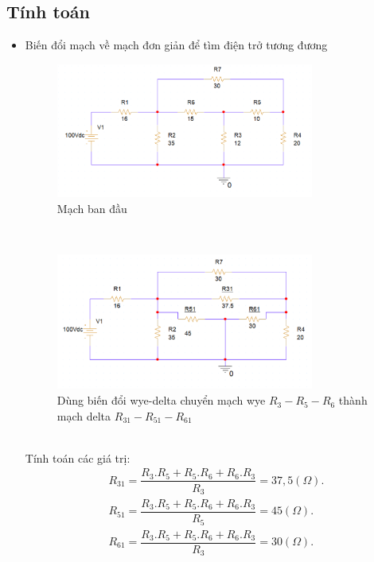 \subsection{Tính toán}
\begin{itemize}
    \item Biến đổi mạch về mạch đơn giản để tìm điện trở tương đương\\
    \begin{figure}[!htbp]
        \centering
        \includegraphics[width=0.8\textwidth]{graphics/ex10/f2.png}
        \caption{Mạch ban đầu}
        \end{figure}\\
        \begin{figure}[!htbp]
            \centering
            \includegraphics[width=0.8\textwidth]{graphics/ex10/f3.png}
            \caption{Dùng biến đổi wye-delta chuyển mạch wye \(R_3-R_5-R_6\) thành mạch delta \(R_{31}-R_{51}-R_{61}\)}
            \end{figure}\\
    Tính toán các giá trị:
    \begin{align*}
        R_{31} = \dfrac{R_3.R_5 + R_5.R_6 + R_6.R_3}{R_3} = 37,5 (\Omega).\\
        R_{51} = \dfrac{R_3.R_5 + R_5.R_6 + R_6.R_3}{R_5} = 45 (\Omega).\\
        R_{61} = \dfrac{R_3.R_5 + R_5.R_6 + R_6.R_3}{R_3} = 30 (\Omega).\\

\end{align*}
\end{itemize}
